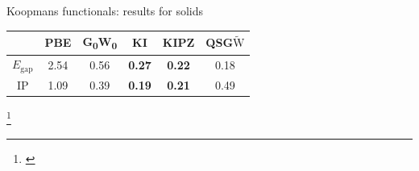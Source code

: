 \documentclass[xcolor=table,aspectratio=169]{beamer}
\newcommand\blfootcite[1]{%
  \begingroup
  \renewcommand\thefootnote{}\footnote{\hspace{-4ex}\cite{#1}}%
  \addtocounter{footnote}{-1}%
  \endgroup
}
\numberwithin{equation}{section}
\begin{document}
\begin{frame}{Koopmans functionals: results for solids}
\begin{minipage}[c]{0.6\textwidth}
      \vspace{1ex}
      \begin{tabular}{c S[table-format = 2.2] S[table-format = 2.2] >{\color{seaborn_red}\bfseries}S[table-format = 2.2] >{\color{seaborn_red}\bfseries}S[table-format = 2.2] S[table-format = 2.2]}
                          & {PBE} & {G\textsubscript{0}W\textsubscript{0}} & {KI} & {KIPZ} & {QSG$\tilde{\mathrm{W}}$} \\
         \midrule
         \midrule
         $E_\mathrm{gap}$ & 2.54  & 0.56                                   & 0.27 & 0.22   & 0.18                      \\
         \midrule
         IP               & 1.09  & 0.39                                   & 0.19 & 0.21   & 0.49                      \\
      \end{tabular}
   \end{minipage}

   \blfootcite{Nguyen2018}
\end{frame}
\end{document}
